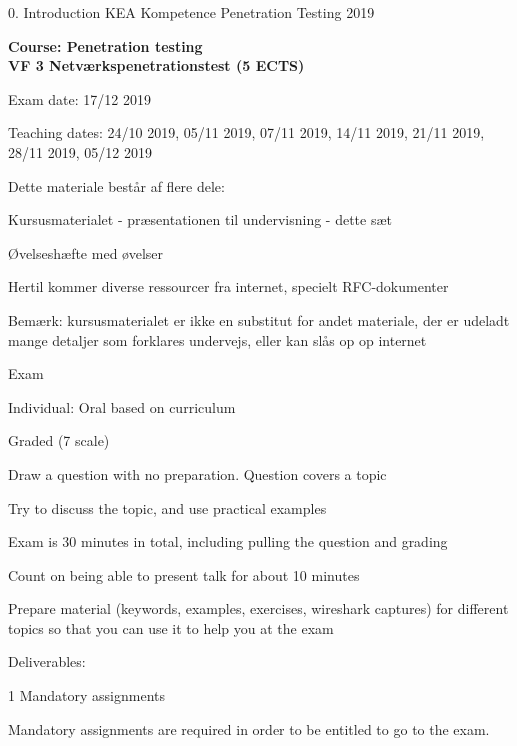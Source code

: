\documentclass[Screen16to9,17pt]{foils}
\begin{document}
\mytitlepage
{0. Introduction}
{KEA Kompetence Penetration Testing 2019}

\hlkprofiluk


{\Large\bf Course: Penetration testing\\
VF 3 Netværkspenetrationstest (5 ECTS)}


Exam date:  17/12 2019

Teaching dates:
24/10 2019, 05/11 2019, 07/11 2019, 14/11 2019, 21/11 2019, 28/11 2019, 05/12 2019



\begin{list1}
\item Dette materiale består af flere dele:
\begin{list2}
\item Kursusmaterialet - præsentationen til undervisning - dette sæt
\item Øvelseshæfte med øvelser
\end{list2}
\item Hertil kommer diverse ressourcer fra internet, specielt RFC-dokumenter
\item Bemærk: kursusmaterialet er ikke en substitut for andet materiale, der er udeladt mange detaljer som forklares undervejs, eller kan slås op op internet
\end{list1}



\begin{list2}
\item Exam
\item Individual: Oral based on curriculum
\item Graded (7 scale)
\item Draw a question with no preparation. Question covers a topic
\item Try to discuss the topic, and use practical examples
\item Exam is 30 minutes in total, including pulling the question and grading
\item Count on being able to present talk for about 10 minutes
\item Prepare material (keywords, examples, exercises, wireshark captures) for different topics so that you can use it to help you at the exam

\vskip 5mm
\item Deliverables:
\item 1 Mandatory assignments
\item Mandatory assignments are required in order to be entitled to go to the exam.
\end{list2}
\end{document}
